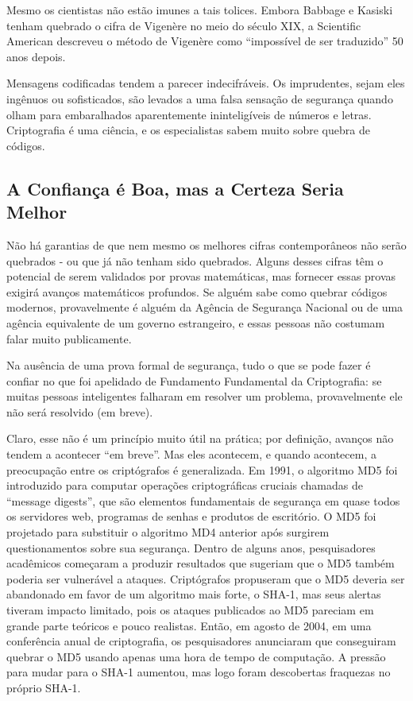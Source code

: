 \documentclass{book}
\begin{document}
Mesmo os cientistas não estão imunes a tais tolices. Embora Babbage e Kasiski tenham quebrado o cifra de Vigenère no meio do século XIX, a Scientific American descreveu o método de Vigenère como ``impossível de ser traduzido'' 50 anos depois.

Mensagens codificadas tendem a parecer indecifráveis. Os imprudentes, sejam eles ingênuos ou sofisticados, são levados a uma falsa sensação de segurança quando olham para embaralhados aparentemente ininteligíveis de números e letras. Criptografia é uma ciência, e os especialistas sabem muito sobre quebra de códigos.


\subsection{A Confiança é Boa, mas a Certeza Seria Melhor}
\label{segredos:confianca}

Não há garantias de que nem mesmo os melhores cifras contemporâneos não serão quebrados - ou que já não tenham sido quebrados. Alguns desses cifras têm o potencial de serem validados por provas matemáticas, mas fornecer essas provas exigirá avanços matemáticos profundos. Se alguém sabe como quebrar códigos modernos, provavelmente é alguém da Agência de Segurança Nacional ou de uma agência equivalente de um governo estrangeiro, e essas pessoas não costumam falar muito publicamente.

Na ausência de uma prova formal de segurança, tudo o que se pode fazer é confiar no que foi apelidado de Fundamento Fundamental da Criptografia: se muitas pessoas inteligentes falharam em resolver um problema, provavelmente ele não será resolvido (em breve).

Claro, esse não é um princípio muito útil na prática; por definição, avanços não tendem a acontecer ``em breve''. Mas eles acontecem, e quando acontecem, a preocupação entre os criptógrafos é generalizada. Em 1991, o algoritmo MD5 foi introduzido para computar operações criptográficas cruciais chamadas de ``message digests'', que são elementos fundamentais de segurança em quase todos os servidores web, programas de senhas e produtos de escritório. O MD5 foi projetado para substituir o algoritmo MD4 anterior após surgirem questionamentos sobre sua segurança. Dentro de alguns anos, pesquisadores acadêmicos começaram a produzir resultados que sugeriam que o MD5 também poderia ser vulnerável a ataques. Criptógrafos propuseram que o MD5 deveria ser abandonado em favor de um algoritmo mais forte, o SHA-1, mas seus alertas tiveram impacto limitado, pois os ataques publicados ao MD5 pareciam em grande parte teóricos e pouco realistas. Então, em agosto de 2004, em uma conferência anual de criptografia, os pesquisadores anunciaram que conseguiram quebrar o MD5 usando apenas uma hora de tempo de computação. A pressão para mudar para o SHA-1 aumentou, mas logo foram descobertas fraquezas no próprio SHA-1.
\end{document}
